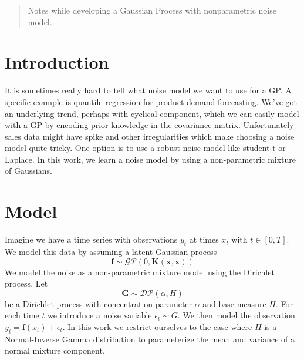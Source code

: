 \documentclass{article}
\newcommand{\GP}[2]{\mathcal{GP}\left({#1},{#2}\right)}
\newcommand{\DP}[2]{\mathcal{DP}\left({#1},{#2}\right)}
\begin{document}
 


\begin{abstract} 
Notes while developing a Gaussian Process with nonparametric noise model.
\end{abstract} 

\section{Introduction}
\label{intro}

It is sometimes really hard to tell what noise model we want to use for a GP. A specific example is quantile regression for product demand forecasting. We've got an underlying trend, perhaps with cyclical component, which we can easily model with a GP by encoding prior knowledge in the covariance matrix. Unfortunately sales data might have spike and other irregularities which make choosing a noise model quite tricky. One option is to use a robust noise model like student-t or Laplace. In this work, we learn a noise model by using a non-parametric mixture of Gaussians.



\section{Model}
\label{model}

Imagine we have a time series with observations $y_t$ at times $x_t$ with $t \in [0,T]$. We model this data by assuming a latent Gaussian process
\begin{equation}
\bm{f} \sim \GP{0}{\bm{K}(\bm{x},\bm{x})}
\end{equation}
We model the noise as a non-parametric mixture model using the Dirichlet process. Let
\begin{equation}
\bm{G} \sim \DP{\alpha}{H}
\end{equation}
be a Dirichlet process with concentration parameter $\alpha$ and base measure $H$. For each time $t$ we introduce a noise variable $\epsilon_t \sim G$. We then model the observation $y_t = \bm{f}(x_t) + \epsilon_t$. In this work we restrict ourselves to the case where $H$ is a Normal-Inverse Gamma distribution to parameterize the mean and variance of a normal mixture component.
\end{document}
